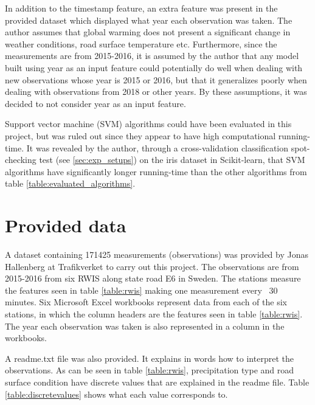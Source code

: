 	In addition to the timestamp feature, an extra feature was present in the provided dataset which displayed what year each observation was taken. The author assumes that global warming does not present a significant change in weather conditions, road surface temperature etc. Furthermore, since the measurements are from 2015-2016, it is assumed by the author that any model built using year as an input feature could potentially do well when dealing with new observations whose year is 2015 or 2016, but that it generalizes poorly when dealing with observations from 2018 or other years. By these assumptions, it was decided to not consider year as an input feature. 

	Support vector machine (SVM) algorithms could have been evaluated in this project, but was ruled out since they appear to have high computational running-time. It was revealed by the author, through a cross-validation classification spot-checking test (see \ref{sec:exp_setups}) on the iris dataset in Scikit-learn, that SVM algorithms have significantly longer running-time than the other algorithms from table \ref{table:evaluated_algorithms}.

\section{Provided data} \label{sec:provided_data}
	A dataset containing 171425 measurements (observations) was provided by Jonas Hallenberg at Trafikverket to carry out this project. The observations are from 2015-2016 from six RWIS along state road E6 in Sweden. The stations measure the features seen in table \ref{table:rwis} making one measurement every ~30 minutes. Six Microsoft Excel workbooks represent data from each of the six stations, in which the column headers are the features seen in table \ref{table:rwis}. The year each observation was taken is also represented in a column in the workbooks.

	A readme.txt file was also provided. It explains in words how to interpret the observations. As can be seen in table \ref{table:rwis}, precipitation type and road surface condition have discrete values that are explained in the readme file. Table \ref{table:discretevalues} shows what each value corresponds to.
		
